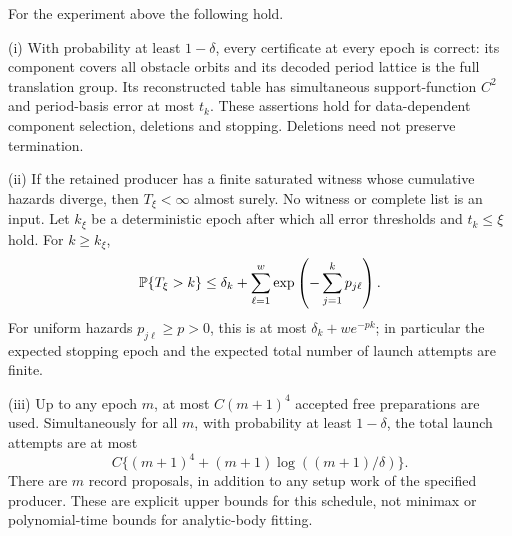 \begin{theorem}\label{thm:sequential}
For the experiment above the following hold.

\smallskip\noindent
\textup{(i)} With probability at least $1-\delta$, every certificate at
every epoch is correct: its component covers all obstacle orbits and its
decoded period lattice is the full translation group. Its reconstructed
table has simultaneous support-function $C^2$ and period-basis error at
most $t_k$. These assertions hold for data-dependent component selection,
deletions and stopping. Deletions need not preserve termination.

\smallskip\noindent
\textup{(ii)} If the retained producer has a finite saturated witness
whose cumulative hazards diverge, then $T_\xi<\infty$ almost surely.
No witness or complete list is an input. Let $k_\xi$ be a deterministic
epoch after which all error thresholds and $t_k\le\xi$ hold. For
$k\ge k_\xi$,
\begin{equation}\label{eq:stopping-tail}
 \mathbb P\{T_\xi>k\}\le\delta_k+
       \sum_{\ell=1}^w\exp\left(-\sum_{j=1}^kp_{j\ell}\right).
\end{equation}
For uniform hazards $p_{j\ell}\ge p>0$, this is at most
$\delta_k+w e^{-pk}$; in particular the expected stopping epoch and
the expected total number of launch attempts are finite.

\smallskip\noindent
\textup{(iii)} Up to any epoch $m$, at most $C(m+1)^4$ accepted free
preparations are used. Simultaneously for all $m$, with probability at
least $1-\delta$, the total launch attempts are at most
\begin{equation}\label{eq:sequential-cost}
 C\{(m+1)^4+(m+1)\log((m+1)/\delta)\}.
\end{equation}
There are $m$ record proposals, in addition to any setup work of the
specified producer. These are explicit upper bounds for this schedule,
not minimax or polynomial-time bounds for analytic-body fitting.
\end{theorem}
